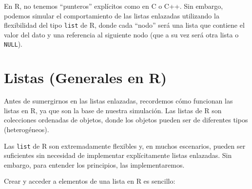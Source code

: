 \documentclass[
  spanish,
  letterpaper,
  DIV=11,
  numbers=noendperiod]{scrreprt}
\begin{document}
En R, no tenemos ``punteros'' explícitos como en C o C++. Sin embargo,
podemos simular el comportamiento de las listas enlazadas utilizando la
flexibilidad del tipo \texttt{list} de R, donde cada ``nodo'' será una
lista que contiene el valor del dato y una referencia al siguiente nodo
(que a su vez será otra lista o \texttt{NULL}).

\section{Listas (Generales en R)}\label{listas-generales-en-r}

Antes de sumergirnos en las listas enlazadas, recordemos cómo funcionan
las listas en R, ya que son la base de nuestra simulación. Las listas de
R son colecciones ordenadas de objetos, donde los objetos pueden ser de
diferentes tipos (heterogéneos).

\begin{tcolorbox}[enhanced jigsaw, arc=.35mm, bottomrule=.15mm, bottomtitle=1mm, breakable, colback=white, colbacktitle=quarto-callout-note-color!10!white, colframe=quarto-callout-note-color-frame, coltitle=black, left=2mm, leftrule=.75mm, opacityback=0, opacitybacktitle=0.6, rightrule=.15mm, title=\textcolor{quarto-callout-note-color}{\faInfo}\hspace{0.5em}{Nota}, titlerule=0mm, toprule=.15mm, toptitle=1mm]

Las \texttt{list} de R son extremadamente flexibles y, en muchos
escenarios, pueden ser suficientes sin necesidad de implementar
explícitamente listas enlazadas. Sin embargo, para entender los
principios, las implementaremos.

\end{tcolorbox}

Crear y acceder a elementos de una lista en R es sencillo:
\end{document}
